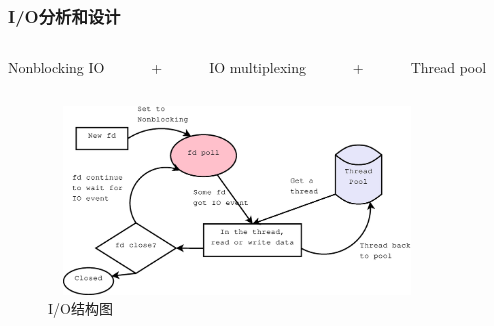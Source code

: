 \documentclass[10pt,dvipdfm]{beamer}
\begin{document}
\begin{frame}
	\frametitle{I/O分析和设计}
	\begin{columns}
		\begin{column}{0.25\textwidth}
			\begin{alertblock}{}
				Nonblocking IO
			\end{alertblock}
			
		\end{column}
		
		\begin{column}{0.02\textwidth}
			\begin{alertblock}{}
				+
			\end{alertblock}
		\end{column}
		
		\begin{column}{0.28\textwidth}
			\begin{alertblock}{}
				IO multiplexing
			\end{alertblock}
			
		\end{column}
		
		\begin{column}{0.02\textwidth}
			\begin{alertblock}{}
				+
			\end{alertblock}
		\end{column}
		
		\begin{column}{0.22\textwidth}
			\begin{alertblock}{}
				Thread pool
			\end{alertblock}
		\end{column}
	\end{columns}

	\begin{figure}[htbp]
	\centering
	\includegraphics[height=5cm, width=10cm]{pics/IO.eps}
	\caption{I/O结构图}
	\end{figure}

	
\end{frame}
\end{document}

